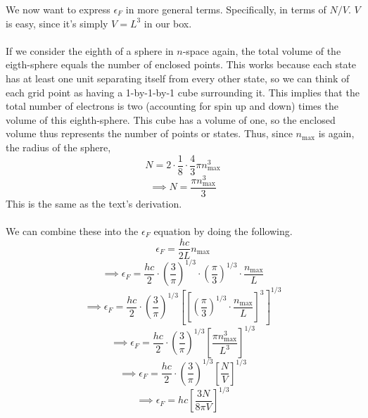 \documentclass[12pt]{article}
\begin{document}
\begin{flushleft}
We now want to express $\epsilon_F$ in more general terms.
Specifically, in terms of $N/V$.
$V$ is easy, since it's simply $V=L^3$ in our box.\\~\\

If we consider the eighth of a sphere in $n$-space again, the total volume of the eigth-sphere equals the number of enclosed points.
This works because each state has at least one unit separating itself from every other state, so we can think of each grid point as having a 1-by-1-by-1 cube surrounding it.
This implies that the total number of electrons is two (accounting for spin up and down) times the volume of this eighth-sphere.
This cube has a volume of one, so the enclosed volume thus represents the number of points or states.
Thus, since $n_\text{max}$ is again, the radius of the sphere,
$$N=2\cdot\frac{1}{8}\cdot\frac{4}{3}\pi n_\text{max}^3$$
$$\implies N=\frac{\pi n_\text{max}^3}{3}$$
This is the same as the text's derivation.\\~\\

We can combine these into the $\epsilon_F$ equation by doing the following.
$$\epsilon_F=\frac{hc}{2L}n_\text{max}$$
$$\implies\epsilon_F=\frac{hc}{2}\cdot\left(\frac{3}{\pi}\right)^{1/3}\cdot\left(\frac{\pi}{3}\right)^{1/3}\cdot\frac{n_\text{max}}{L}$$
$$\implies\epsilon_F=\frac{hc}{2}\cdot\left(\frac{3}{\pi}\right)^{1/3}\left[\left[\left(\frac{\pi}{3}\right)^{1/3}\cdot\frac{n_\text{max}}{L}\right]^3\right]^{1/3}$$
$$\implies\epsilon_F=\frac{hc}{2}\cdot\left(\frac{3}{\pi}\right)^{1/3}\left[\frac{\pi n_\text{max}^3}{L^3}\right]^{1/3}$$
$$\implies\epsilon_F=\frac{hc}{2}\cdot\left(\frac{3}{\pi}\right)^{1/3}\left[\frac{N}{V}\right]^{1/3}$$
$$\implies\epsilon_F=hc\left[\frac{3N}{8\pi V}\right]^{1/3}$$\\~\\


\end{flushleft}
\end{document}

